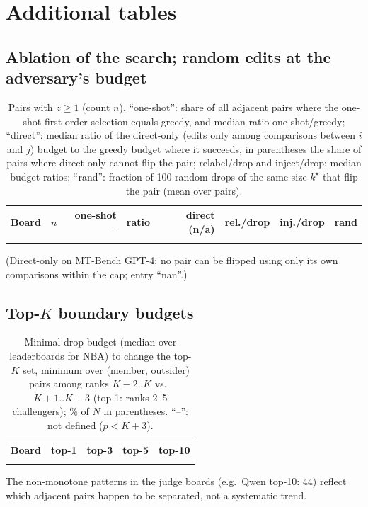 \documentclass{article}
\theoremstyle{plain}
\theoremstyle{remark}
\newcommand{\kstar}{k^\star}
\begin{document}
\section{Additional tables}
\subsection{Ablation of the search; random edits at the adversary's budget}\label{app:ablation}
\begin{table}[H]
\caption{Pairs with $z\ge1$ (count $n$). ``one-shot'': share of all adjacent pairs where the one-shot first-order selection equals greedy, and median ratio one-shot/greedy; ``direct'': median ratio of the direct-only (edits only among comparisons between $i$ and $j$) budget to the greedy budget where it succeeds, in parentheses the share of pairs where direct-only cannot flip the pair; relabel/drop and inject/drop: median budget ratios; ``rand'': fraction of 100 random drops of the same size $\kstar$ that flip the pair (mean over pairs).}\label{tab:ablation}
\centering\small\setlength{\tabcolsep}{3pt}
\begin{tabular}{lrrrrrrr}
\toprule
Board & $n$ & one-shot = & ratio & direct (n/a) & rel./drop & inj./drop & rand\\
\midrule
\\
\bottomrule
\end{tabular}
\end{table}
(Direct-only on MT-Bench GPT-4: no pair can be flipped using only its own comparisons within the cap; entry ``nan''.)

\subsection{Top-$K$ boundary budgets}\label{app:topk}
\begin{table}[H]
\caption{Minimal drop budget (median over leaderboards for NBA) to change the top-$K$ set, minimum over (member, outsider) pairs among ranks $K\!-\!2..K$ vs.\ $K\!+\!1..K\!+\!3$ (top-1: ranks 2--5 challengers); \% of $N$ in parentheses. ``--'': not defined ($p<K+3$).}
\centering\small
\begin{tabular}{lrrrr}
\toprule
Board & top-1 & top-3 & top-5 & top-10\\
\midrule
\\
\bottomrule
\end{tabular}
\end{table}
The non-monotone patterns in the judge boards (e.g.\ Qwen top-10: 44) reflect which adjacent pairs happen to be separated, not a systematic trend.
\end{document}
